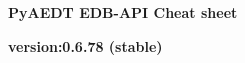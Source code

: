 \documentclass[landscape]{article}
\begin{document}
\raggedright
\footnotesize
\begin{center}
     \Huge{\textbf{PyAEDT EDB-API Cheat sheet}} \\
\end{center}
\begin{center}
\small{\textbf{version:0.6.78 (stable)}} \\
\end{center}
\vspace{-0.15cm}
\noindent\makebox[\linewidth]{\rule{\paperwidth}{2pt}}
\end{document}
